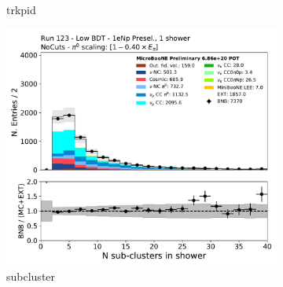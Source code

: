 \begin{figure}[H]
\begin{subfigure}{0.3\textwidth}
    \caption{trkpid}
    \end{subfigure}
    \begin{subfigure}{0.3\textwidth}
    \includegraphics[width=1.0\textwidth]{Sidebands/Figures/1eNp/LPID_NPOneShr_None_pi0e40/subcluster.pdf}
    \caption{subcluster}
    \end{subfigure}
    \caption{} 
    \label{fig:LPID_1eNp_2}
\end{figure}

